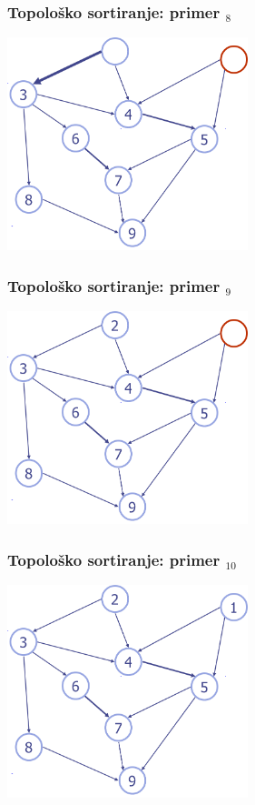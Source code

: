\documentclass[compress,aspectratio=169]{beamer}
\begin{document}
\begin{frame}[fragile]
  \frametitle{Topološko sortiranje: primer $_8$}
  \begin{center}
    \includegraphics[width=7cm]{asp-14-pic55.png}
  \end{center}
\end{frame}

\begin{frame}[fragile]
  \frametitle{Topološko sortiranje: primer $_9$}
  \begin{center}
    \includegraphics[width=7cm]{asp-14-pic56.png}
  \end{center}
\end{frame}

\begin{frame}[fragile]
  \frametitle{Topološko sortiranje: primer $_{10}$}
  \begin{center}
    \includegraphics[width=7cm]{asp-14-pic57.png}
  \end{center}
\end{frame}
\end{document}
